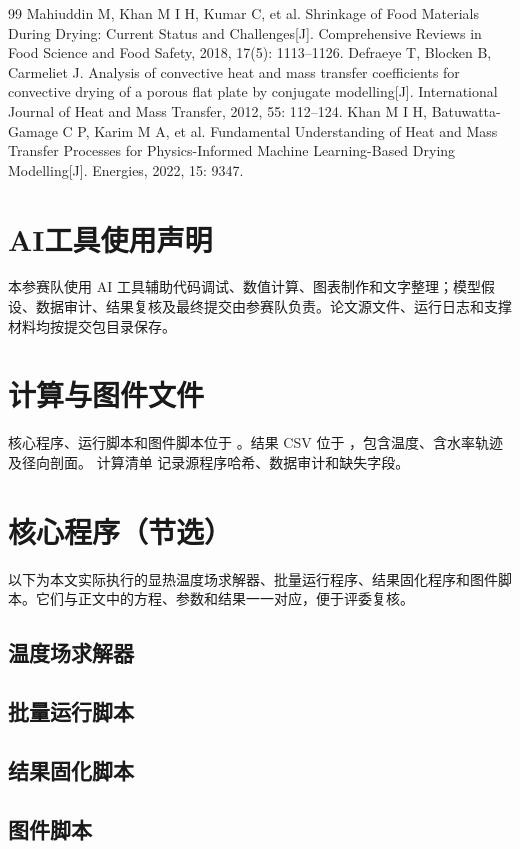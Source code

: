 \documentclass[withoutpreface,bwprint]{cumcmthesis}
\begin{document}
\begin{thebibliography}{99}
 Mahiuddin M, Khan M I H, Kumar C, et al. Shrinkage of Food Materials During Drying: Current Status and Challenges[J]. Comprehensive Reviews in Food Science and Food Safety, 2018, 17(5): 1113--1126.
 Defraeye T, Blocken B, Carmeliet J. Analysis of convective heat and mass transfer coefficients for convective drying of a porous flat plate by conjugate modelling[J]. International Journal of Heat and Mass Transfer, 2012, 55: 112--124.
 Khan M I H, Batuwatta-Gamage C P, Karim M A, et al. Fundamental Understanding of Heat and Mass Transfer Processes for Physics-Informed Machine Learning-Based Drying Modelling[J]. Energies, 2022, 15: 9347.
\end{thebibliography}

\section*{AI工具使用声明}
本参赛队使用 AI 工具辅助代码调试、数值计算、图表制作和文字整理；模型假设、数据审计、结果复核及最终提交由参赛队负责。论文源文件、运行日志和支撑材料均按提交包目录保存。

\clearpage
\begin{appendices}
\section{计算与图件文件}
核心程序、运行脚本和图件脚本位于 。结果 CSV 位于 ，包含温度、含水率轨迹及径向剖面。
计算清单  记录源程序哈希、数据审计和缺失字段。
\section{核心程序（节选）}
以下为本文实际执行的显热温度场求解器、批量运行程序、结果固化程序和图件脚本。它们与正文中的方程、参数和结果一一对应，便于评委复核。
\subsection{温度场求解器}
\subsection{批量运行脚本}
\subsection{结果固化脚本}
\subsection{图件脚本}
\end{appendices}
\end{document}
